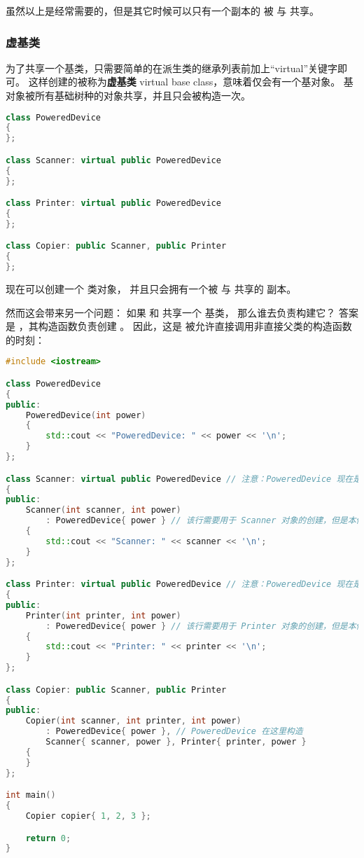 \documentclass[../../LearnCpp.tex]{subfiles}
\begin{document}
虽然以上是经常需要的，但是其它时候可以只有一个副本的  被  与  共享。

\subsubsection*{虚基类}

为了共享一个基类，只需要简单的在派生类的继承列表前加上“virtual”关键字即可。
这样创建的被称为\textbf{虚基类} virtual base class，意味着仅会有一个基对象。
基对象被所有基础树种的对象共享，并且只会被构造一次。

\begin{lstlisting}[language=C++]
class PoweredDevice
{
};

class Scanner: virtual public PoweredDevice
{
};

class Printer: virtual public PoweredDevice
{
};

class Copier: public Scanner, public Printer
{
};
\end{lstlisting}

现在可以创建一个  类对象，
并且只会拥有一个被  与  共享的  副本。

然而这会带来另一个问题：
如果  和  共享一个  基类，
那么谁去负责构建它？
答案是 ，其构造函数负责创建 。
因此，这是  被允许直接调用非直接父类的构造函数的时刻：

\begin{lstlisting}[language=C++]
#include <iostream>

class PoweredDevice
{
public:
    PoweredDevice(int power)
    {
        std::cout << "PoweredDevice: " << power << '\n';
    }
};

class Scanner: virtual public PoweredDevice // 注意：PoweredDevice 现在是虚基类
{
public:
    Scanner(int scanner, int power)
        : PoweredDevice{ power } // 该行需要用于 Scanner 对象的创建，但是本例忽略
    {
        std::cout << "Scanner: " << scanner << '\n';
    }
};

class Printer: virtual public PoweredDevice // 注意：PoweredDevice 现在是虚基类
{
public:
    Printer(int printer, int power)
        : PoweredDevice{ power } // 该行需要用于 Printer 对象的创建，但是本例忽略
    {
        std::cout << "Printer: " << printer << '\n';
    }
};

class Copier: public Scanner, public Printer
{
public:
    Copier(int scanner, int printer, int power)
        : PoweredDevice{ power }, // PoweredDevice 在这里构造
        Scanner{ scanner, power }, Printer{ printer, power }
    {
    }
};

int main()
{
    Copier copier{ 1, 2, 3 };

    return 0;
}
\end{lstlisting}
\end{document}
